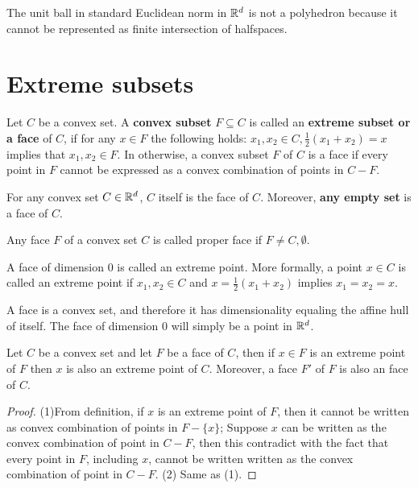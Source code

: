\begin{refsection}
\begin{remark}
	The unit ball in standard Euclidean norm in $\mathbb{R}^d$ is not a polyhedron because it cannot be represented as finite intersection of halfspaces.
\end{remark}


\section{Extreme subsets}
\begin{definition}
Let $C$ be a convex set. A \textbf{convex subset} $F\subseteq C$ is called an \textbf{extreme subset or a face} of $C$, if for any $x\in F$ the following holds: $x_1,x_2 \in C, \frac{1}{2}(x_1+x_2) = x$ implies that $x_1,x_2\in F$. In otherwise, a convex subset $F$ of $C$ is a face if every point in $F$ cannot be expressed as a convex combination of points in $C-F$. 
\end{definition}

\begin{remark}
	For any convex set $C\in \mathbb{R}^d$, $C$ itself is the face of $C$. Moreover, \textbf{any empty set} is a face of $C$.
\end{remark}

\begin{definition}
Any face $F$ of a convex set $C$ is called proper face if $F\neq C,\emptyset$.
\end{definition}



\begin{definition}
	A face of dimension 0 is called an extreme point. More formally, a point $x\in C$ is called an extreme point if $x_1,x_2 \in C$ and $x = \frac{1}{2}(x_1+x_2)$ implies $x_1=x_2=x$. 
\end{definition}
\begin{remark}
	A face is a convex set, and therefore it has dimensionality equaling the affine hull of itself. The face of dimension 0 will simply be a point in $\mathbb{R}^d$.
\end{remark}

\begin{lemma}
	Let $C$ be a convex set and let $F$ be a face of $C$, then if $x\in F$ is an extreme point of $F$ then $x$ is also an extreme point of $C$.
	Moreover, a face $F'$ of $F$ is also an face of $C$.
\end{lemma}
\begin{proof}
(1)From definition, if $x$ is an extreme point of $F$, then it cannot be written as convex combination of points in $F-\{x\}$; Suppose $x$ can be written as the convex combination of point in $C-F$, then this contradict with the fact that every point in $F$, including $x$, cannot be written written as the convex combination of point in $C-F$.
(2) Same as (1).
\end{proof}


\end{refsection}
